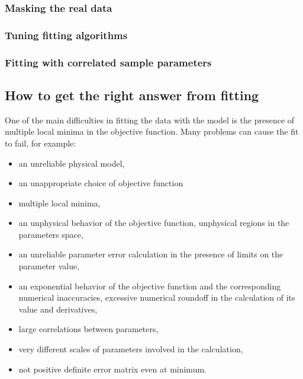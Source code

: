\subsubsection{Masking the real data}
\MissingSection
\subsubsection{Tuning fitting algorithms}
\MissingSection
\subsubsection{Fitting with correlated sample parameters}
\MissingSection


\subsection {How to get the right answer from fitting}
  \label{sec:FittingRightAnswers}

One of the main difficulties in fitting the data with the model
is the presence of multiple
local minima in the objective function. Many problems can cause the
fit to fail, for example:
\begin{itemize}
\item an unreliable physical model,
\item an unappropriate choice of objective function
\item multiple local minima,
\item an unphysical behavior of the objective function, unphysical regions
  in the parameters space,
\item an unreliable parameter error calculation in the presence of
  limits on the parameter value,
\item an exponential behavior of the objective function and the
  corresponding numerical inaccuracies, excessive numerical roundoff
  in the calculation of its value and derivatives,
\item large correlations between parameters,
\item very different scales of parameters involved in the calculation,
\item not positive definite error matrix even at minimum.
\end{itemize}


